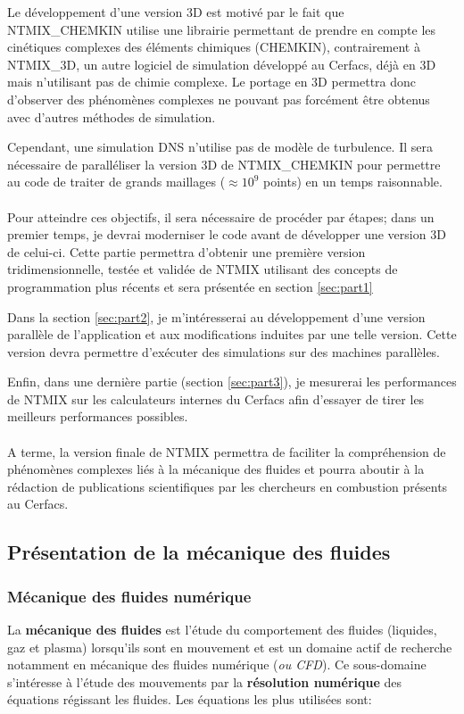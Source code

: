 Le développement d'une version 3D est motivé par le fait que NTMIX\_CHEMKIN utilise une librairie permettant de prendre en compte les cinétiques complexes des éléments chimiques (CHEMKIN), contrairement à NTMIX\_3D, un autre logiciel de simulation développé au Cerfacs, déjà en 3D mais n'utilisant pas de chimie complexe. Le portage en 3D permettra donc d'observer des phénomènes complexes ne pouvant pas forcément être obtenus avec d'autres méthodes de simulation.


Cependant, une simulation DNS n'utilise pas de modèle de turbulence. Il sera nécessaire de paralléliser la version 3D de NTMIX\_CHEMKIN pour permettre au code de traiter de grands maillages ($\approx 10^9$ points) en un temps raisonnable.


\paragraph{}Pour atteindre ces objectifs, il sera nécessaire de procéder par étapes; dans un premier temps, je devrai moderniser le code avant de développer une version 3D de celui-ci. Cette partie permettra d'obtenir une première version tridimensionnelle, testée et validée de NTMIX utilisant des concepts de programmation plus récents et sera présentée en section \ref{sec:part1}

Dans la section \ref{sec:part2}, je m'intéresserai au développement d'une version parallèle de l'application et aux modifications induites par une telle version. Cette version devra permettre d'exécuter des simulations sur des machines parallèles.

Enfin, dans une dernière partie (section \ref{sec:part3}), je mesurerai les performances de NTMIX sur les calculateurs internes du Cerfacs afin d'essayer de tirer les meilleurs performances possibles.

\paragraph{}A terme, la version finale de NTMIX permettra de faciliter la compréhension de phénomènes complexes liés à la mécanique des fluides et pourra aboutir à la rédaction de publications scientifiques par les chercheurs en combustion présents au Cerfacs.

\subsection{Présentation de la mécanique des fluides}
\subsubsection{Mécanique des fluides numérique}
La \textbf{mécanique des fluides} est l'étude du comportement des fluides (liquides, gaz et plasma) lorsqu'ils sont en mouvement et est un domaine actif de recherche notamment en mécanique des fluides numérique (\textit{ou CFD}). Ce sous-domaine s'intéresse à l'étude des mouvements par la \textbf{résolution numérique} des équations régissant les fluides. Les équations les plus utilisées sont:

